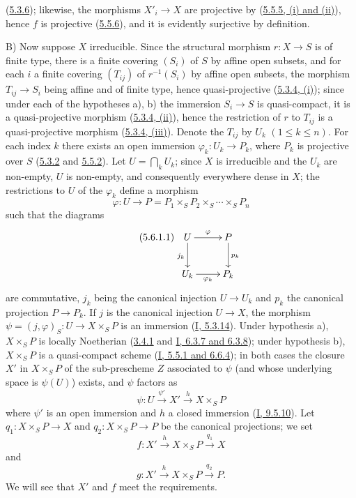 
(\hyperref[II.5.3.6]{5.3.6}); likewise, the morphisms $X'_i\to X$ are
projective by (\hyperref[II.5.5.5]{5.5.5, (i) and (ii)}), hence $f$ is
projective (\hyperref[II.5.5.6]{5.5.6}), and it is evidently surjective by
definition.

B) Now suppose $X$ irreducible. Since the structural morphism
$r:X\to S$ is of finite type, there is a finite covering $(S_i)$ of $S$ by
affine open subsets, and for each $i$ a finite covering $(T_{ij})$ of
$r^{-1}(S_i)$ by affine open subsets, the morphism $T_{ij}\to S_i$ being
affine and of finite type, hence quasi-projective
(\hyperref[II.5.3.4]{5.3.4, (i)}); since under each of the hypotheses a),
b) the immersion $S_i\to S$ is quasi-compact, it is a quasi-projective
morphism (\hyperref[II.5.3.4]{5.3.4, (ii)}), hence the restriction of
$r$ to $T_{ij}$ is a quasi-projective morphism
(\hyperref[II.5.3.4]{5.3.4, (iii)}). Denote the $T_{ij}$ by $U_k$
$(1\leq k\leq n)$. For each index $k$ there exists an open immersion
$\varphi_k:U_k\to P_k$, where $P_k$ is projective over $S$
(\hyperref[II.5.3.2]{5.3.2} and \hyperref[II.5.5.2]{5.5.2}). Let
$U=\bigcap_kU_k$; since $X$ is irreducible and the $U_k$ are non-empty, $U$ is
non-empty, and consequently everywhere dense in $X$; the restrictions to $U$
of the $\varphi_k$ define a morphism
\[
\varphi:U\to P=P_1\times_SP_2\times_S\cdots\times_SP_n
\]
such that the diagrams
\[
\tag{5.6.1.1}
\label{II.5.6.1.1}
\xymatrix{
U\ar[r]^\varphi\ar[d]_{j_k} & P\ar[d]^{p_k}\\
U_k\ar[r]_{\varphi_k} & P_k
}
\]
are commutative, $j_k$ being the canonical injection $U\to U_k$ and $p_k$ the
canonical projection $P\to P_k$. If $j$ is the canonical injection $U\to X$,
the morphism $\psi=(j,\varphi)_S:U\to X\times_SP$ is an immersion
(\hyperref[I.5.3.14]{I, 5.3.14}). Under hypothesis a), $X\times_SP$ is
locally Noetherian (\hyperref[II.3.4.1]{3.4.1} and
\hyperref[I.6.3.7]{I, 6.3.7 and 6.3.8}); under hypothesis b),
$X\times_SP$ is a quasi-compact scheme
(\hyperref[I.5.5.1]{I, 5.5.1 and 6.6.4}); in both cases the closure
$X'$ in $X\times_SP$ of the sub-prescheme $Z$ associated to $\psi$ (and whose
underlying space is $\psi(U)$) exists, and $\psi$ factors as
\[
\tag{5.6.1.2}
\label{II.5.6.1.2}
\psi:U\xrightarrow{\psi'}X'\xrightarrow{h}X\times_SP
\]
where $\psi'$ is an open immersion and $h$ a closed immersion
(\hyperref[I.9.5.10]{I, 9.5.10}). Let
$q_1:X\times_SP\to X$ and $q_2:X\times_SP\to P$ be the canonical projections;
we set
\[
\tag{5.6.1.3}
\label{II.5.6.1.3}
f:X'\xrightarrow{h}X\times_SP\xrightarrow{q_1}X
\]
and
\[
\tag{5.6.1.4}
\label{II.5.6.1.4}
g:X'\xrightarrow{h}X\times_SP\xrightarrow{q_2}P.
\]
We will see that $X'$ and $f$ meet the requirements.

